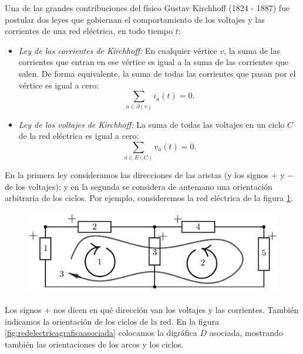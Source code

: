 Una de las grandes contribuciones del físico Gustav Kirchhoff (1824 - 1887) fue postular dos leyes que gobiernan el comportamiento de los voltajes y las corrientes de una red eléctrica, en todo tiempo $t$:  

\begin{itemize}
    \item \textit{Ley de las corrientes de Kirchhoff:} En cualquier vértice $v$, la suma de las corrientes que entran en ese vértice es igual a la suma de las corrientes que salen. De forma equivalente, la suma de todas las corrientes que pasan por el vértice es igual a cero:$$ \sum_{a \in \partial(v)} i_{a}(t) = 0.$$
    \item \textit{Ley de los voltajes de Kirchhoff:} La suma de todas las voltajes en un ciclo $C$ de la red eléctrica es igual a cero: $$\sum_{a \in E(C)} v_{a}(t) = 0.$$
\end{itemize}

En la primera ley consideramos las direcciones de las aristas (y los signos $+$ y $-$ de los voltajes); y en la segunda se considera de antemano una orientación arbitraria de los ciclos. Por ejemplo, consideremos la red eléctrica de la figura \ref{fig:redelectrica}.

\begin{figure}[H]
    \centering
    \includegraphics[scale=0.25]{img/imgchapter4/redelectrica.jpg}
    \caption{}
    \label{fig:redelectrica}
\end{figure}

Los signos $+$ nos dicen en qué dirección van los voltajes y las corrientes. También indicamos la orientación de los ciclos de la red. En la figura \ref{fig:redelectricagraficaasociada} colocamos la digráfica $D$ asociada, mostrando también las orientaciones de los arcos y los ciclos.

